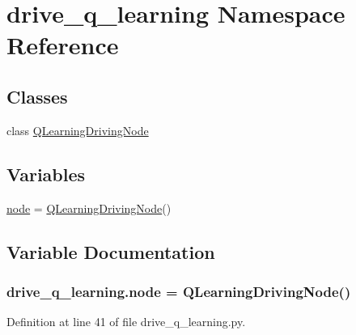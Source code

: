 \hypertarget{namespacedrive__q__learning}{}\section{drive\+\_\+q\+\_\+learning Namespace Reference}
\label{namespacedrive__q__learning}
\subsection*{Classes}
\begin{DoxyCompactItemize}
\item 
class \hyperlink{classdrive__q__learning_1_1_q_learning_driving_node}{Q\+Learning\+Driving\+Node}
\end{DoxyCompactItemize}
\subsection*{Variables}
\begin{DoxyCompactItemize}
\item 
\hyperlink{namespacedrive__q__learning_aa4060863cf405a3575503833f607ad1b}{node} = \hyperlink{classdrive__q__learning_1_1_q_learning_driving_node}{Q\+Learning\+Driving\+Node}()
\end{DoxyCompactItemize}


\subsection{Variable Documentation}
\subsubsection[{\texorpdfstring{node}{node}}]{\setlength{\rightskip}{0pt plus 5cm}drive\+\_\+q\+\_\+learning.\+node = {\bf Q\+Learning\+Driving\+Node}()}\hypertarget{namespacedrive__q__learning_aa4060863cf405a3575503833f607ad1b}{}\label{namespacedrive__q__learning_aa4060863cf405a3575503833f607ad1b}


Definition at line 41 of file drive\+\_\+q\+\_\+learning.\+py.

